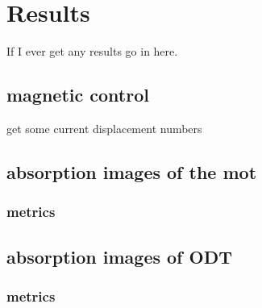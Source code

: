 \chapter{Results}

If I ever get any results go in here.

\section{magnetic control}

get some current displacement numbers

\section{absorption images of the mot}

    \subsection{metrics}

\section{absorption images of ODT}

    \subsection{metrics}
